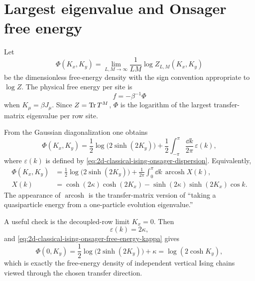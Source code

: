 \section{Largest eigenvalue and Onsager free energy}
\label{sec:2d-classical-ising-onsager-free-energy}

Let
\begin{equation}
\label{eq:2d-classical-ising-phi-definition}
    \Phi(K_x,K_y)
    =
    \lim_{L,M\to\infty}\frac{1}{LM}\log Z_{L,M}(K_x,K_y)
\end{equation}
be the dimensionless free-energy density with the sign convention appropriate to
$\log Z$.  The physical free energy per site is
\begin{equation}
    f=-\beta^{-1}\Phi
\end{equation}
when $K_\mu=\beta J_\mu$.  Since $Z=\operatorname{Tr} T^M$, $\Phi$ is the logarithm of the
largest transfer-matrix eigenvalue per row site.

From the Gaussian diagonalization one obtains
\begin{equation}
\label{eq:2d-classical-ising-onsager-free-energy-kappa}
    \Phi(K_x,K_y)
    =
    \frac12\log\!\bigl(2\sinh(2K_y)\bigr)
    +
    \frac12\int_{-\pi}^{\pi}\frac{\dd k}{2\pi}\,\varepsilon(k),
\end{equation}
where $\varepsilon(k)$ is defined by
\cref{eq:2d-classical-ising-onsager-dispersion}.  Equivalently,
\begin{align}
\label{eq:2d-classical-ising-onsager-free-energy-standard}
    \Phi(K_x,K_y)
    &=
    \frac12\log\!\bigl(2\sinh(2K_y)\bigr)
    +
    \frac{1}{2\pi}
    \int_0^\pi \dd k\,\operatorname{arcosh} X(k),
    \\
    X(k)
    &=
    \cosh(2\kappa)\cosh(2K_x)
    -
    \sinh(2\kappa)\sinh(2K_x)\cos k .
\end{align}
The appearance of $\operatorname{arcosh}$ is the transfer-matrix version of
``taking a quasiparticle energy from a one-particle evolution eigenvalue.''

A useful check is the decoupled-row limit $K_x=0$.  Then
\begin{equation}
    \varepsilon(k)=2\kappa,
\end{equation}
and \cref{eq:2d-classical-ising-onsager-free-energy-kappa} gives
\begin{equation}
    \Phi(0,K_y)
    =
    \frac12\log\!\bigl(2\sinh(2K_y)\bigr)+\kappa
    =
    \log(2\cosh K_y),
\end{equation}
which is exactly the free-energy density of independent vertical Ising chains
viewed through the chosen transfer direction.

